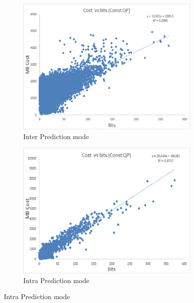 \documentclass[11pt]{article} %
\begin{document}
\begin{figure}
	\centering
	\begin{subfigure}[t]{0.49\textwidth}
		\centering
		\includegraphics[width=\textwidth]{CostVsBits/const_QP/CostvsBits_ConstQP_inter.png}
		\caption{Inter Prediction mode}
		\label{fig: Cost vs bits mode inter}
	\end{subfigure}
	\begin{subfigure}[t]{0.49\textwidth}
		\centering
		\includegraphics[width=\textwidth]{CostVsBits/const_QP/CostvsBits_ConstQP_intra.png}
		\caption{Intra Prediction mode}
		\label{fig: Cost vs bits mode intra}
	\end{subfigure}

\end{figure}
\end{document}
